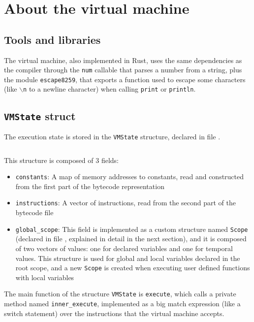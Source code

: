 \documentclass[11pt]{scrreprt}
\begin{document}
\chapter{About the virtual machine}

\section{Tools and libraries}
The virtual machine, also implemented in Rust, uses the same dependencies as the compiler through the \texttt{num} callable that parses a number from a string, plus the module \texttt{escape8259}, that exports a function used to escape some characters (like \texttt{$\backslash$n} to a newline character) when calling \texttt{print} or \texttt{println}.

\section{\texttt{VMState} struct}
The execution state is stored in the \texttt{VMState} structure, declared in file .

\inputminted[firstline=10,lastline=16]{rust}{/home/mario/git/MarioJim/miniclj/miniclj-lib/src/vm/state.rs}

This structure is composed of 3 fields:
\begin{itemize}
  \item \texttt{constants}: A map of memory addresses to constants, read and constructed from the first part of the bytecode representation
  \item \texttt{instructions}: A vector of instructions, read from the second part of the bytecode file
  \item \texttt{global\_scope}: This field is implemented as a custom structure named \texttt{Scope} (declared in file , explained in detail in the next section), and it is composed of two vectors of values: one for declared variables and one for temporal values. This structure is used for global and local variables declared in the root scope, and a new \texttt{Scope} is created when executing user defined functions with local variables
\end{itemize}

The main function of the structure \texttt{VMState} is \texttt{execute}, which calls a private method named \texttt{inner\_execute}, implemented as a big match expression (like a switch statement) over the instructions that the virtual machine accepts.
\end{document}
